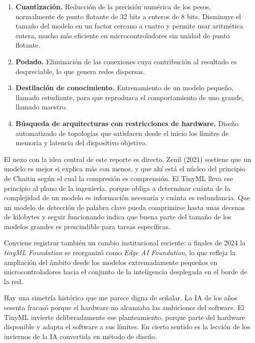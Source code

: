 \documentclass[12pt,letterpaper,oneside]{article}
\begin{document}
\begin{enumerate}[leftmargin=1.6cm,itemsep=0.2em]
  \item \textbf{Cuantización.} Reducción de la precisión numérica de los pesos, normalmente de punto flotante de 32 bits a enteros de 8 bits. Disminuye el tamaño del modelo en un factor cercano a cuatro y permite usar aritmética entera, mucho más eficiente en microcontroladores sin unidad de punto flotante.
  \item \textbf{Podado.} Eliminación de las conexiones cuya contribución al resultado es despreciable, lo que genera redes dispersas.
  \item \textbf{Destilación de conocimiento.} Entrenamiento de un modelo pequeño, llamado estudiante, para que reproduzca el comportamiento de uno grande, llamado maestro.
  \item \textbf{Búsqueda de arquitecturas con restricciones de hardware.} Diseño automatizado de topologías que satisfacen desde el inicio los límites de memoria y latencia del dispositivo objetivo.
\end{enumerate}

El nexo con la idea central de este reporte es directo. Zenil (2021) sostiene que un modelo es mejor si explica más con menos, y que ahí está el núcleo del principio de Chaitin según el cual la compresión es comprensión. El TinyML lleva ese principio al plano de la ingeniería, porque obliga a determinar cuánta de la complejidad de un modelo es información necesaria y cuánta es redundancia. Que un modelo de detección de palabra clave pueda comprimirse hasta unas decenas de kilobytes y seguir funcionando indica que buena parte del tamaño de los modelos grandes es prescindible para tareas específicas.

Conviene registrar también un cambio institucional reciente: a finales de 2024 la \textit{tinyML Foundation} se reorganizó como \textit{Edge AI Foundation}, lo que refleja la ampliación del ámbito desde los modelos extremadamente pequeños en microcontroladores hacia el conjunto de la inteligencia desplegada en el borde de la red.

Hay una simetría histórica que me parece digna de señalar. La IA de los años sesenta fracasó porque el hardware no alcanzaba las ambiciones del software. El TinyML invierte deliberadamente ese planteamiento, porque parte del hardware disponible y adapta el software a sus límites. En cierto sentido es la lección de los inviernos de la IA convertida en método de diseño.


\end{document}
